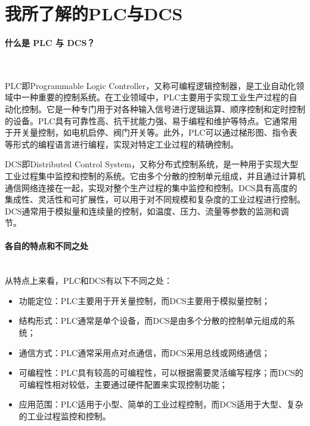 \documentclass[UTF8]{article}
\begin{document}
\begin{titlepage}

\end{titlepage}

%
\section{我所了解的PLC与DCS}

\paragraph{什么是 PLC 与 DCS？}~{}

PLC即Programmable Logic Controller，又称可编程逻辑控制器，是工业自动化领域中一种重要的控制系统。在工业领域中，PLC主要用于实现工业生产过程的自动化控制。它是一种专门用于对各种输入信号进行逻辑运算、顺序控制和定时控制的设备。PLC具有可靠性高、抗干扰能力强、易于编程和维护等特点。它通常用于开关量控制，如电机启停、阀门开关等。此外，PLC可以通过梯形图、指令表等形式的编程语言进行编程，实现对特定工业过程的精确控制。

DCS即Distributed Control System，又称分布式控制系统，是一种用于实现大型工业过程集中监控和控制的系统。它由多个分散的控制单元组成，并且通过计算机通信网络连接在一起，实现对整个生产过程的集中监控和控制。DCS具有高度的集成性、灵活性和可扩展性，可以用于对不同规模和复杂度的工业过程进行控制。DCS通常用于模拟量和连续量的控制，如温度、压力、流量等参数的监测和调节。

\paragraph{各自的特点和不同之处}~{}
\\
从特点上来看，PLC和DCS有以下不同之处：
\begin{itemize}
    \item 功能定位：PLC主要用于开关量控制，而DCS主要用于模拟量控制；
    \item 结构形式：PLC通常是单个设备，而DCS是由多个分散的控制单元组成的系统；
    \item 通信方式：PLC通常采用点对点通信，而DCS采用总线或网络通信；
    \item 可编程性：PLC具有较高的可编程性，可以根据需要灵活编写程序；而DCS的可编程性相对较低，主要通过硬件配置来实现控制功能；
    \item 应用范围：PLC适用于小型、简单的工业过程控制，而DCS适用于大型、复杂的工业过程监控和控制。
\end{itemize}
\end{document}
